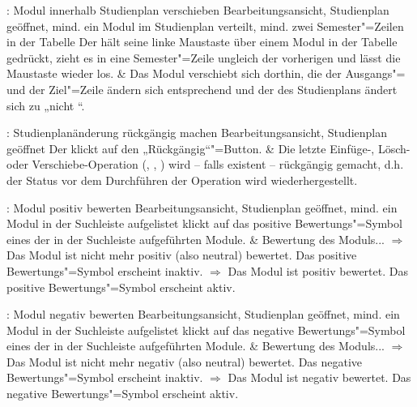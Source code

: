 \begin{usecase}{: Modul innerhalb Studienplan verschieben}
	{Bearbeitungsansicht, \gls{Studienplan} geöffnet, mind. ein \gls{Modul} im Studienplan verteilt, mind. zwei Semester"=Zeilen in der Tabelle}
	Der  hält seine linke Maustaste über einem Modul in der Tabelle gedrückt, zieht es in eine Semester"=Zeile ungleich der vorherigen und lässt die Maustaste wieder los.
	& Das Modul verschiebt sich dorthin, die  der Ausgangs"= und der Ziel"=Zeile ändern sich entsprechend und der  des Studienplans ändert sich zu „nicht “.
\end{usecase}

\begin{usecase}{: Studienplanänderung rückgängig machen\opt}
	{Bearbeitungsansicht, \gls{Studienplan} geöffnet}
	Der  klickt auf den „Rückgängig“"=Button.
	& Die letzte Einfüge-, Lösch- oder Verschiebe-Operation (, , ) wird – falls existent – rückgängig gemacht, d.h. der Status vor dem Durchführen der Operation wird wiederhergestellt.
\end{usecase}

\begin{usecase}{: Modul positiv bewerten}
	{Bearbeitungsansicht, \gls{Studienplan} geöffnet, mind. ein \gls{Modul} in der Suchleiste aufgelistet}
	 klickt auf das positive Bewertungs"=Symbol eines der in der Suchleiste aufgeführten Module.
	& Bewertung des Moduls... \newline
	 $\Rightarrow$ Das Modul ist nicht mehr positiv (also neutral) bewertet. Das positive Bewertungs"=Symbol erscheint inaktiv. \newline
	 $\Rightarrow$ Das Modul ist positiv bewertet. Das positive Bewertungs"=Symbol erscheint aktiv.
\end{usecase}

\begin{usecase}{: Modul negativ bewerten}
	{Bearbeitungsansicht, \gls{Studienplan} geöffnet, mind. ein \gls{Modul} in der Suchleiste aufgelistet}
	 klickt auf das negative Bewertungs"=Symbol eines der in der Suchleiste aufgeführten Module.
	& Bewertung des Moduls... \newline
	 $\Rightarrow$ Das Modul ist nicht mehr negativ (also neutral) bewertet. Das negative Bewertungs"=Symbol erscheint inaktiv. \newline
	 $\Rightarrow$ Das Modul ist negativ bewertet. Das negative Bewertungs"=Symbol erscheint aktiv.
\end{usecase}

